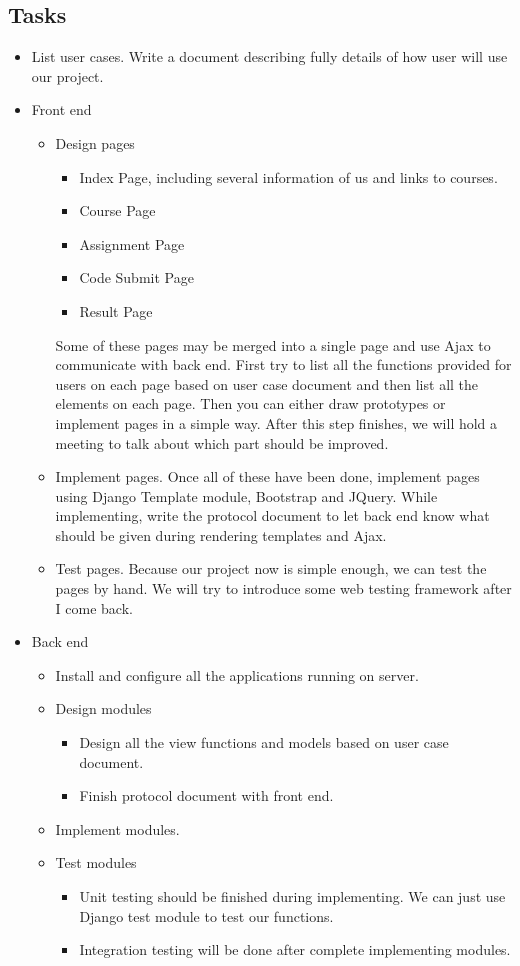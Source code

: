 \documentclass[12pt,a4paper]{article}
\begin{document}
\subsection{Tasks}
\begin{itemize}
	\item List user cases. Write a document describing fully details of how user will use our project. 
	\item Front end
	\begin{itemize}
		\item Design pages
		\begin{itemize}
			\item Index Page, including several information of us and links to courses.
			\item Course Page
			\item Assignment Page
			\item Code Submit Page
			\item Result Page
		\end{itemize}
		Some of these pages may be merged into a single page and use Ajax to communicate with back end. First try to list all the functions provided for users on each page based on user case document and then list all the elements on each page. Then you can either draw prototypes or implement pages in a simple way. After this step finishes, we will hold a meeting to talk about which part should be improved.
		\item Implement pages. Once all of these have been done, implement pages using Django Template module, Bootstrap and JQuery. While implementing, write the protocol document to let back end know what should be given during rendering templates and Ajax.
		\item Test pages. Because our project now is simple enough, we can test the pages by hand. We will try to introduce some web testing framework after I come back.
	\end{itemize}
	
	\item Back end
	\begin{itemize}
		\item Install and configure all the applications running on server.
		\item Design modules
		\begin{itemize}
			\item Design all the view functions and models based on user case document.
			\item Finish protocol document with front end.
		\end{itemize}
		\item Implement modules.
		\item Test modules
		\begin{itemize}
			\item Unit testing should be finished during implementing. We can just use Django test module to test our functions.
			\item Integration testing will be done after complete implementing modules.
		\end{itemize}
	\end{itemize}
	

\end{itemize}
\end{document}
